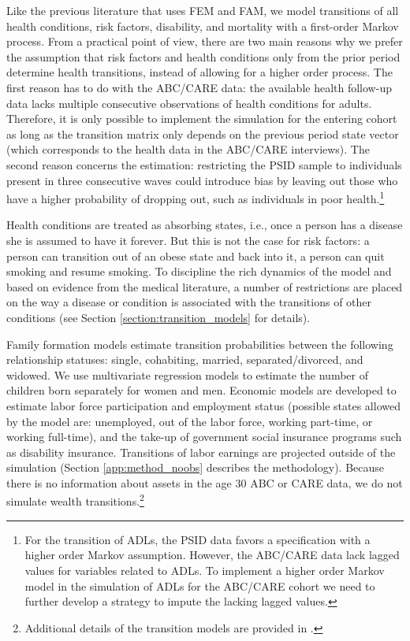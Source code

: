 \noindent Like the previous literature that uses FEM and FAM, we model transitions of all health conditions, risk factors, disability, and mortality with a first-order Markov process. From a practical point of view, there are two main reasons why we prefer the assumption that risk factors and health conditions only from the prior period determine health transitions, instead of allowing for a higher order process. The first reason has to do with the ABC/CARE data: the available health follow-up data lacks multiple consecutive observations of health conditions for adults. Therefore, it is only possible to implement the simulation for the entering cohort as long as the transition matrix only depends on the previous period state vector (which corresponds to the health data in the ABC/CARE interviews). The second reason concerns the estimation: restricting the PSID sample to individuals present in three consecutive waves could introduce bias by leaving out those who have a higher probability of dropping out, such as individuals in poor health.\footnote{For the transition of ADLs, the PSID data favors a specification with a higher order Markov assumption. However, the ABC/CARE data lack lagged values for variables related to ADLs. To implement a higher order Markov model in the simulation of ADLs for the ABC/CARE cohort we need to further develop a strategy to impute the lacking lagged values.} 

\noindent Health conditions are treated as absorbing states, i.e., once a person has a disease she is assumed to have it forever. But this is not the case for risk factors: a person can transition out of an obese state and back into it, a person can quit smoking and resume smoking. To discipline the rich dynamics of the model and based on evidence from the medical literature, a number of restrictions are placed on the way a disease or condition is associated with the transitions of other conditions (see Section \ref{section:transition_models} for details).  

\noindent Family formation models estimate transition probabilities between the following relationship statuses:  single, cohabiting, married, separated/divorced, and widowed. We use multivariate regression models to estimate the number of children born separately for women and men. Economic models are developed to estimate labor force participation and employment status (possible states allowed by the model are: unemployed, out of the labor force, working part-time, or working full-time), and the take-up of government social insurance programs such as disability insurance. 
Transitions of labor earnings are projected outside of the simulation (Section \ref{app:method_noobs} describes the methodology).  Because there is no information about assets in the age 30 ABC or CARE data, we do not simulate wealth transitions.\footnote{Additional details of the transition models are provided in \citet{Goldman_etal_2015_Future-Adult-Model}.} 

